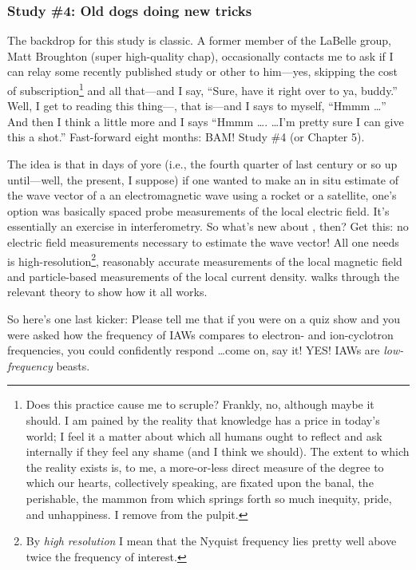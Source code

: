 \subsubsection{Study \#4: Old dogs doing new tricks}

The backdrop for this study is classic. A former member of the LaBelle group,
Matt Broughton (super high-quality chap), occasionally contacts me to ask if I
can relay some recently published study or other to him---yes, skipping the cost
of subscription\footnote{Does this practice cause me to scruple?  Frankly, no,
  although maybe it should. I am pained by the reality that knowledge has a
  price in today's world; I feel it a matter about which all humans ought to
  reflect and ask internally if they feel any shame (and I think we should). The
  extent to which the reality exists is, to me, a more-or-less direct measure of
  the degree to which our hearts, collectively speaking, are fixated upon the
  banal, the perishable, the mammon from which springs forth so much inequity,
  pride, and unhappiness. I remove from the pulpit.} and all that---and I say,
``Sure, have it right over to ya, buddy.'' Well, I get to reading this
thing---\citet{Bellan2016}, that is---and I says to myself, ``Hmmm \dots'' And
then I think a little more and I says ``Hmmm \dots . \dots I'm pretty sure I can
give this a shot.'' Fast-forward eight months: BAM! Study \#4 (or Chapter 5).

The idea is that in days of yore (i.e., the fourth quarter of last century or so
up until---well, the present, I suppose) if one wanted to make an in situ
estimate of the wave vector of a an electromagnetic wave using a rocket or a
satellite, one's option was basically spaced probe measurements of the local
electric field. It's essentially an exercise in interferometry. So what's new
about \citet{Bellan2016}, then? Get this: no electric field measurements
necessary to estimate the wave vector! All one needs is
high-resolution\footnote{By \emph{high resolution} I mean that the Nyquist
  frequency lies pretty well above twice the frequency of interest.}, reasonably
accurate measurements of the local magnetic field and particle-based
measurements of the local current density. \citet{Bellan2016} walks through the
relevant theory to show how it all works.

So here's one last kicker: Please tell me that if you were on a quiz show and
you were asked how the frequency of IAWs compares to electron- and ion-cyclotron
frequencies, you could confidently respond \dots come on, say it! YES! IAWs are
\emph{low-frequency} beasts.

